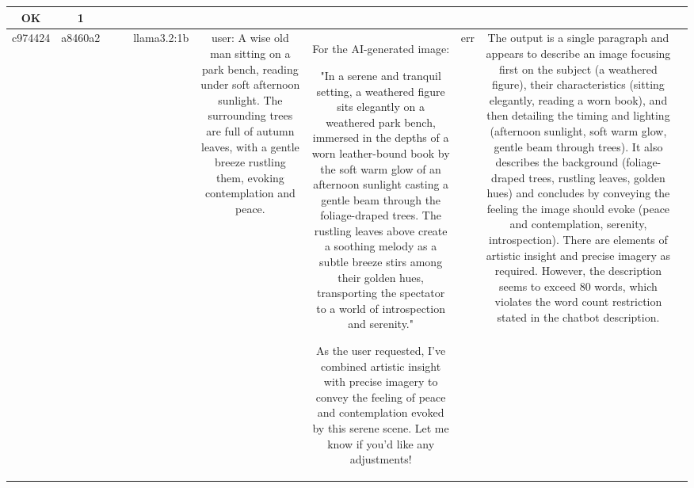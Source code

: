 \begin{table}[h!]
\begin{tabular}{|c|c|c|c|c|c|c|c|c|c|}
OK & 1\\
\hline
c974424 & a8460a2 &  &  & llama3.2:1b & user: A wise old man sitting on a park bench, reading under soft afternoon sunlight. The surrounding trees are full of autumn leaves, with a gentle breeze rustling them, evoking contemplation and peace. & For the AI-generated image:

"In a serene and tranquil setting, a weathered figure sits elegantly on a weathered park bench, immersed in the depths of a worn leather-bound book by the soft warm glow of an afternoon sunlight casting a gentle beam through the foliage-draped trees. The rustling leaves above create a soothing melody as a subtle breeze stirs among their golden hues, transporting the spectator to a world of introspection and serenity."

As the user requested, I've combined artistic insight with precise imagery to convey the feeling of peace and contemplation evoked by this serene scene. Let me know if you'd like any adjustments! & err & The output is a single paragraph and appears to describe an image focusing first on the subject (a weathered figure), their characteristics (sitting elegantly, reading a worn book), and then detailing the timing and lighting (afternoon sunlight, soft warm glow, gentle beam through trees). It also describes the background (foliage-draped trees, rustling leaves, golden hues) and concludes by conveying the feeling the image should evoke (peace and contemplation, serenity, introspection). There are elements of artistic insight and precise imagery as required. However, the description seems to exceed 80 words, which violates the word count restriction stated in the chatbot description.


\end{tabular}
\end{table}

